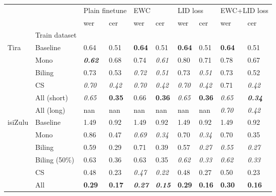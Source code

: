 \begin{tabular}{llllllllll}
\toprule
 &  & \multicolumn{2}{l}{Plain finetune} & \multicolumn{2}{l}{EWC} & \multicolumn{2}{l}{LID loss} & \multicolumn{2}{l}{EWC+LID loss} \\
 &  & wer & cer & wer & cer & wer & cer & wer & cer \\
 & Train dataset &  &  &  &  &  &  &  &  \\
\midrule
Tira & Baseline & 0.64 & 0.51 & \textbf{0.64} & 0.51 & \textbf{0.64} & 0.51 & \textbf{0.64} & 0.51 \\
 & Mono & \textit{\textbf{0.62}} & 0.68 & 0.74 & \textit{0.61} & 0.80 & 0.71 & 0.78 & 0.67 \\
 & Biling & 0.73 & 0.53 & \textit{0.72} & \textit{0.51} & 0.73 & \textit{0.51} & 0.73 & 0.52 \\
 & CS & \textit{0.70} & \textit{0.42} & \textit{0.70} & \textit{0.42} & \textit{0.70} & \textit{0.42} & 0.71 & \textit{0.42} \\
 & All (short) & \textit{0.65} & \textbf{0.35} & 0.66 & \textbf{0.36} & \textit{0.65} & \textbf{0.36} & \textit{0.65} & \textit{\textbf{0.34}} \\
 & All (long) & nan & nan & nan & nan & nan & nan & \textit{0.70} & \textit{0.42} \\
\midrule
isiZulu & Baseline & 1.49 & 0.92 & 1.49 & 0.92 & 1.49 & 0.92 & 1.49 & 0.92 \\
 & Mono & 0.86 & 0.47 & \textit{0.69} & \textit{0.34} & 0.70 & \textit{0.34} & 0.70 & 0.35 \\
 & Biling & 0.59 & 0.29 & 0.71 & 0.39 & 0.57 & \textit{0.27} & \textit{0.55} & \textit{0.27} \\
 & Biling (50\%) & 0.63 & 0.36 & 0.63 & 0.35 & \textit{0.62} & \textit{0.33} & \textit{0.62} & \textit{0.33} \\
 & CS & 0.48 & 0.23 & \textit{0.47} & \textit{0.22} & 0.48 & 0.27 & 0.50 & 0.23 \\
 & All & \textbf{0.29} & \textbf{0.17} & \textit{\textbf{0.27}} & \textit{\textbf{0.15}} & \textbf{0.29} & \textbf{0.16} & \textbf{0.30} & \textbf{0.16} \\
\bottomrule
\end{tabular}
